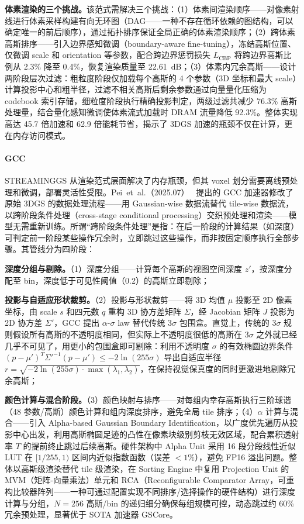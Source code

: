 \textbf{体素渲染的三个挑战。}该范式需解决三个挑战：（1）体素间渲染顺序——对像素射线进行体素采样构建有向无环图（DAG——一种不存在循环依赖的图结构，可以确定唯一的前后顺序），通过拓扑排序保证全局正确的体素渲染顺序；（2）跨体素高斯排序——引入边界感知微调（boundary-aware fine-tuning），冻结高斯位置、仅微调 scale 和 orientation 等参数，配合跨边界惩罚损失 $L_{\text{CBP}}$ 将跨边界高斯比例从 2.3\% 降至 0.4\%，恢复渲染质量至 22.61~dB；（3）体素内冗余高斯——设计两阶段层次过滤：粗粒度阶段仅加载每个高斯的 4 个参数（3D 坐标和最大 scale）计算投影中心和粗半径，过滤不相关高斯后剩余参数通过向量量化压缩为 codebook 索引存储，细粒度阶段执行精确投影判定，两级过滤共减少 76.3\% 高斯处理量，结合量化感知微调使体素流式加载时 DRAM 流量降低 92.3\%。整体实现高达 45.7 倍加速和 62.9 倍能耗节省，揭示了 3DGS 加速的瓶颈不仅在计算，更在内存访问模式。

\paragraph{GCC}
STREAMINGGS 从渲染范式层面解决了内存瓶颈，但其 voxel 划分需要离线预处理和微调，部署灵活性受限。Pei~et~al.（2025.07）~\cite{2507_15300} 提出的 GCC 加速器修改了原始 3DGS 的数据处理流程——用 Gaussian-wise 数据流替代 tile-wise 数据流，以跨阶段条件处理（cross-stage conditional processing）交织预处理和渲染——模型无需重新训练。所谓“跨阶段条件处理”是指：在后一阶段的计算结果（如深度）可判定前一阶段某些操作冗余时，立即跳过这些操作，而非按固定顺序执行全部步骤。其管线分为四阶段：

\textbf{深度分组与剔除。}（1）深度分组——计算每个高斯的视图空间深度 $z'$，按深度分配至 bin，深度低于可见性阈值（0.2）的高斯立即剔除；

\textbf{投影与自适应形状裁剪。}（2）投影与形状裁剪——将 3D 均值 $\mu$ 投影至 2D 像素坐标，由 scale $s$ 和四元数 $q$ 重构 3D 协方差矩阵 $\Sigma$，经 Jacobian 矩阵 $J$ 投影为 2D 协方差 $\Sigma'$，GCC 提出 $\alpha$-$\sigma$ law 替代传统 $3\sigma$ 包围盒。直觉上，传统的 $3\sigma$ 规则假设所有高斯的不透明度相同，但实际上不透明度很低的高斯在 $3\sigma$ 之外就已经几乎不可见了，用更小的包围盒即可剔除：利用不透明度 $\sigma$ 的有效椭圆边界条件 $(p - \mu')^T \Sigma'^{-1} (p - \mu') \leq -2\ln(255\sigma)$ 导出自适应半径 $r = \sqrt{-2\ln(255\sigma) \cdot \max(\lambda_1, \lambda_2)}$，在保持视觉保真度的同时更激进地剔除冗余高斯；

\textbf{颜色计算与混合阶段。}（3）颜色映射与排序——对每组内幸存高斯执行三阶球谐（48 参数/高斯）颜色计算和组内深度排序，避免全局 tile 排序；（4）$\alpha$ 计算与混合——引入 Alpha-based Gaussian Boundary Identification，以广度优先遍历从投影中心出发，利用高斯椭圆足迹的凸性在像素块级别剪枝无效区域，配合累积透射率 $T$ 的提前终止跳过后续高斯。硬件架构中 Alpha Unit 采用 16 段分段线性近似 LUT 在 $[1/255, 1)$ 区间内近似指数函数（误差 $< 1\%$），避免 FP16 溢出问题。整体以高斯级渲染替代 tile 级渲染，在 Sorting Engine 中复用 Projection Unit 的 MVM（矩阵-向量乘法）单元和 RCA（Reconfigurable Comparator Array，可重构比较器阵列——一种可通过配置实现不同排序/选择操作的硬件结构）进行深度计算与分组，$N = 256$ 高斯/bin 的递归细分确保每组规模可控，动态跳过约 60\% 冗余预处理，显著优于 SOTA 加速器 GSCore。

